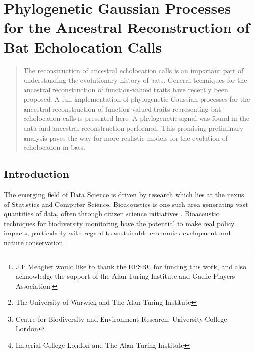 \documentclass{ws-rv9x6}
\begin{document}
\chapter[Ancestral Reconstruction of Bat Echolocation Calls]{Phylogenetic Gaussian Processes for the Ancestral Reconstruction of Bat Echolocation Calls}\label{ra_ch1}

\author[J.P. Meagher et al.]{J.P. Meagher\footnote{J.P Meagher would like to thank the EPSRC for funding this work, and also acknowledge the support of the Alan Turing Institute and Gaelic Players Association.}, T. Damoulas\footnote{The University of Warwick and The Alan Turing Institute}, K.E. Jones\footnote{Centre for Biodiversity and Environment Research, University College London}, and M. Girolami\footnote{Imperial College London and The Alan Turing Institute}\\}

\address{Department of Statistics,\\ The University of Warwick.\\
	J.Meagher@Warwick.ac.uk}

\begin{abstract}
The reconstruction of ancestral echolocation calls is an important part of understanding the evolutionary history of bats. General techniques for the ancestral reconstruction of function-valued traits have recently been proposed. A full implementation of phylogenetic Gaussian processes for the ancestral reconstruction of function-valued traits representing bat echolocation calls is presented here. A phylogenetic signal was found in the data and ancestral reconstruction performed. This promising preliminary analysis paves the way for more realistic models for the evolution of echolocation in bats.
\end{abstract}
\body

\section{Introduction}
\label{sec:intro}
The emerging field of Data Science is driven by research which lies at the nexus of Statistics and Computer Science. Bioacoustics is one such area generating vast quantities of data, often through citizen science initiatives \cite{pettorelli2013indicator}. Bioacoustic techniques for biodiversity monitoring \cite{stathopoulos2017bat} \cite{damoulas2010bayesian} have the potential to make real policy impacts, particularly with regard to sustainable economic development and nature conservation.
\end{document}

